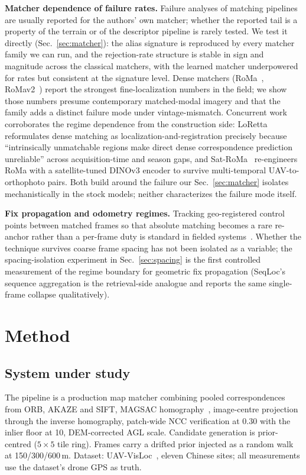 \documentclass[journal]{IEEEtran}
\begin{document}
\textbf{Matcher dependence of failure rates.} Failure analyses of matching pipelines are usually reported for the authors' own matcher; whether the reported tail is a property of the terrain or of the descriptor pipeline is rarely tested. We test it directly (Sec.~\ref{sec:matcher}): the alias signature is reproduced by every matcher family we can run, and the rejection-rate structure is stable in sign and magnitude across the classical matchers, with the learned matcher underpowered for rates but consistent at the signature level. Dense matchers (RoMa~\cite{roma}, RoMav2~\cite{xianvisloc}) report the strongest fine-localization numbers in the field; we show those numbers presume contemporary matched-modal imagery and that the family adds a distinct failure mode under vintage-mismatch. Concurrent work corroborates the regime dependence from the construction side: LoRetta~\cite{loretta} reformulates dense matching as localization-and-registration precisely because ``intrinsically unmatchable regions make direct dense correspondence prediction unreliable'' across acquisition-time and season gaps, and Sat-RoMa~\cite{satroma} re-engineers RoMa with a satellite-tuned DINOv3 encoder to survive multi-temporal UAV-to-orthophoto pairs. Both build around the failure our Sec.~\ref{sec:matcher} isolates mechanistically in the stock models; neither characterizes the failure mode itself.

\textbf{Fix propagation and odometry regimes.} Tracking geo-registered control points between matched frames so that absolute matching becomes a rare re-anchor rather than a per-frame duty is standard in fielded systems~\cite{yao2024,orthotrack}. Whether the technique survives coarse frame spacing has not been isolated as a variable; the spacing-isolation experiment in Sec.~\ref{sec:spacing} is the first controlled measurement of the regime boundary for geometric fix propagation (SeqLoc's sequence aggregation is the retrieval-side analogue and reports the same single-frame collapse qualitatively).

\section{Method}

\subsection{System under study}
{\sloppy
The pipeline is a production map matcher combining pooled correspondences from ORB, AKAZE and SIFT, MAGSAC homography~\cite{magsac}, image-centre projection through the inverse homography, patch-wide NCC verification at 0.30 with the inlier floor at 10, DEM-corrected AGL scale. Candidate generation is prior-centred ($5\times5$ tile ring). Frames carry a drifted prior injected as a random walk at 150/300/600\,m. Dataset: UAV-VisLoc~\cite{uavvisloc}, eleven Chinese sites; all measurements use the dataset's drone GPS as truth.\par}
\end{document}
